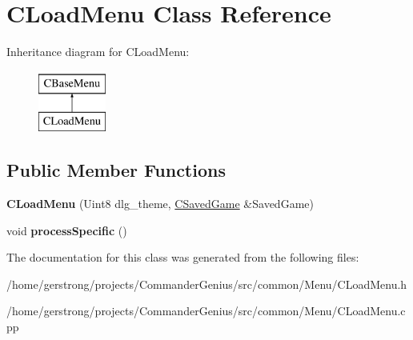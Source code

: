 \hypertarget{class_c_load_menu}{
\section{CLoadMenu Class Reference}
\label{class_c_load_menu}
}
Inheritance diagram for CLoadMenu:\begin{figure}[H]
\begin{center}
\leavevmode
\includegraphics[height=2cm]{class_c_load_menu}
\end{center}
\end{figure}
\subsection*{Public Member Functions}
\begin{DoxyCompactItemize}
\item 
\hypertarget{class_c_load_menu_aa37316811c97eaded4c84db1d7e3cf57}{
{\bfseries CLoadMenu} (Uint8 dlg\_\-theme, \hyperlink{class_c_saved_game}{CSavedGame} \&SavedGame)}
\label{class_c_load_menu_aa37316811c97eaded4c84db1d7e3cf57}

\item 
\hypertarget{class_c_load_menu_a1ebd8fe1e098d6eee3a55830d9fe9c5f}{
void {\bfseries processSpecific} ()}
\label{class_c_load_menu_a1ebd8fe1e098d6eee3a55830d9fe9c5f}

\end{DoxyCompactItemize}


The documentation for this class was generated from the following files:\begin{DoxyCompactItemize}
\item 
/home/gerstrong/projects/CommanderGenius/src/common/Menu/CLoadMenu.h\item 
/home/gerstrong/projects/CommanderGenius/src/common/Menu/CLoadMenu.cpp\end{DoxyCompactItemize}
